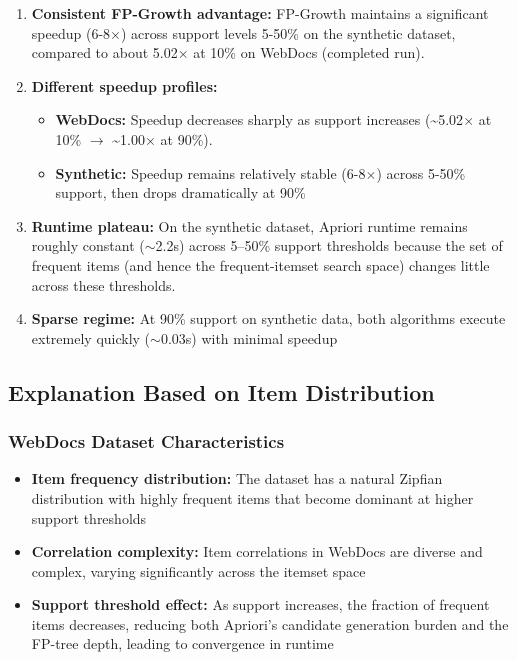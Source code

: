 \documentclass[11pt]{article}
\begin{document}
\begin{enumerate}
    \item \textbf{Consistent FP-Growth advantage:} FP-Growth maintains a significant speedup (6-8$\times$) across support levels 5-50\% on the synthetic dataset, compared to about 5.02$\times$ at 10\% on WebDocs (completed run).
    
    \item \textbf{Different speedup profiles:}
    \begin{itemize}
        \item \textbf{WebDocs:} Speedup decreases sharply as support increases (\textasciitilde5.02$\times$ at 10\% $\to$ \textasciitilde1.00$\times$ at 90\%).
        \item \textbf{Synthetic:} Speedup remains relatively stable (6-8$\times$) across 5-50\% support, then drops dramatically at 90\%
    \end{itemize}
    
    \item \textbf{Runtime plateau:} On the synthetic dataset, Apriori runtime remains roughly constant ($\sim$2.2s) across 5--50\% support thresholds because the set of frequent items (and hence the frequent-itemset search space) changes little across these thresholds.
    
    \item \textbf{Sparse regime:} At 90\% support on synthetic data, both algorithms execute extremely quickly ($\sim$0.03s) with minimal speedup
\end{enumerate}

\subsection{Explanation Based on Item Distribution}

\subsubsection{WebDocs Dataset Characteristics}

\begin{itemize}
    \item \textbf{Item frequency distribution:} The dataset has a natural Zipfian distribution with highly frequent items that become dominant at higher support thresholds
    
    \item \textbf{Correlation complexity:} Item correlations in WebDocs are diverse and complex, varying significantly across the itemset space
    
    \item \textbf{Support threshold effect:} As support increases, the fraction of frequent items decreases, reducing both Apriori's candidate generation burden and the FP-tree depth, leading to convergence in runtime
\end{itemize}
\end{document}
